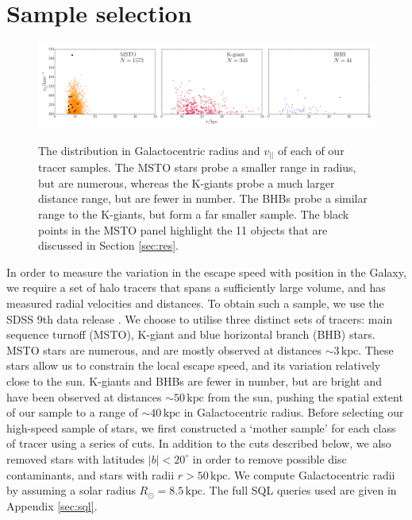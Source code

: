 \documentclass[useAMS,twocolumn,usenatbib]{mn2e}
\def\kpc{{\,\mathrm{kpc}}}
\def\vlos{{v_{||}}}
\begin{document}
\section{Sample selection}

\label{sec:samples}

\begin{figure}
\includegraphics[width=2\columnwidth]{plots/tracer_distributions}\\
\caption{The distribution in Galactocentric radius and $\vlos$ of each of our tracer samples. 
The MSTO stars probe a smaller range in radius, but are numerous, whereas the K-giants probe a much larger distance range, but are fewer in number.
The BHBs probe a similar range to the K-giants, but form a far smaller sample.
The black points in the MSTO panel highlight the 11 objects that are discussed in Section \ref{sec:res}.}
\label{fig:data}
\end{figure}

In order to measure the variation in the escape speed with position in the Galaxy, we require a set of halo tracers that spans a sufficiently large volume, and has measured radial velocities and distances. 
To obtain such a sample, we use the SDSS 9th data release \citep{Ah12}. 
We choose to utilise three distinct sets of tracers: main sequence turnoff (MSTO), K-giant and blue horizontal branch (BHB) stars. 
MSTO stars are numerous, and are mostly observed at distances $\sim 3\kpc$. 
These stars allow us to constrain the local escape speed, and its variation relatively close to the sun. 
K-giants and BHBs are fewer in number, but are bright and have been observed at distances $\sim 50\kpc$ from the sun, pushing the spatial extent of our sample to a range of $\sim 40\kpc$ in Galactocentric radius. 
Before selecting our high-speed sample of stars, we first constructed a `mother sample' for each class of tracer using a series of cuts. 
In addition to the cuts described below, we also removed stars with latitudes $|b| < 20^\circ$ in order to remove possible disc contaminants, and stars with radii $r>50\kpc$. 
We compute Galactocentric radii by assuming a solar radius $R_\odot = 8.5\kpc$. 
The full {\sc SQL} queries used are given in Appendix \ref{sec:sql}.
\end{document}
